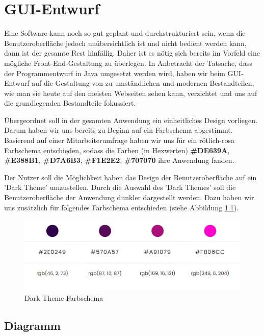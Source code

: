 \chapter{GUI-Entwurf}
\label{chapter:gui}

Eine Software kann noch so gut geplant und durchstrukturiert sein, wenn die Benutzeroberfläche jedoch unübersichtlich ist und nicht bedient werden kann, dann ist der gesamte Rest hinfällig. Daher ist es nötig sich bereits im Vorfeld eine mögliche Front-End-Gestaltung zu überlegen. In Anbetracht der Tatsache, dass der Programmentwurf in Java umgesetzt werden wird, haben wir beim GUI-Entwurf auf die Gestaltung von zu umständlichen und modernen Bestandteilen, wie man sie heute auf den meisten Webseiten sehen kann, verzichtet und uns auf die grundlegenden Bestandteile fokussiert. 


Übergeordnet soll in der gesamten Anwendung ein einheitliches Design vorliegen. Darum haben wir uns bereits zu Beginn auf ein Farbschema abgestimmt. Basierend auf einer Mitarbeiterumfrage haben wir uns für ein rötlich-rosa Farbschema entschieden, sodass die Farben (in Hexwerten) \textbf{\#DE639A}, \textbf{\#E388B1}, \textbf{\#D7A6B3}, \textbf{\#F1E2E2}, \textbf{\#707070} ihre Anwendung fanden. 

Der Nutzer soll die Möglichkeit haben das Design der Benutzeroberfläche auf ein 'Dark Theme' umzustellen. Durch die Auswahl des 'Dark Themes' soll die Benutzeroberfläche der Anwendung dunkler dargestellt werden. Dazu haben wir uns zusätzlich für folgendes Farbschema entschieden (siehe Abbildung \ref{mu:darkmode}).

\begin{figure}[!ht]
    \centering
    \includegraphics[width=\textwidth]{Bilder/Mockup/colorscheme_darkmode.PNG}
    \caption{Dark Theme Farbschema}
    \label{mu:darkmode}
\end{figure}

\newpage

\section{Diagramm}

